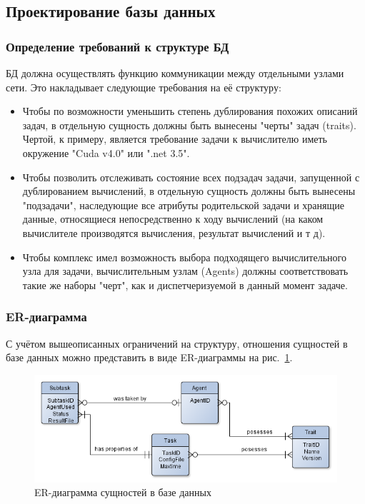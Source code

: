 \documentclass[a4paper,12pt]{report}
\numberwithin{equation}{section}
\begin{document}
\subsection{Проектирование базы данных}
\subsubsection{Определение требований к структуре БД}
БД должна осуществлять функцию коммуникации между отдельными узлами сети.
Это накладывает следующие требования на её структуру:
\begin{itemize}
  \item Чтобы по возможности уменьшить степень дублирования похожих описаний задач, в отдельную сущность должны быть вынесены "черты" задач (traits). Чертой, к примеру, является требование задачи к вычислителю иметь окружение "Cuda v4.0" или ".net 3.5".
  \item Чтобы позволить отслеживать состояние всех подзадач задачи, запущенной с дублированием вычислений, в отдельную сущность должны быть вынесены "подзадачи", наследующие все атрибуты родительской задачи и хранящие данные, относящиеся непосредственно к ходу вычислений (на каком вычислителе производятся вычисления, результат вычислений и т д).
  \item Чтобы комплекс имел возможность выбора подходящего вычислительного узла для задачи, вычислительным узлам (Agents) должны соответствовать такие же наборы "черт", как и диспетчеризуемой в данный момент задаче.
\end{itemize}

\subsubsection{ER-диаграмма}
С учётом вышеописанных ограничений на структуру, отношения сущностей в базе данных можно представить в виде ER-диаграммы на рис.~\ref{fig:db-erd}.

\begin{figure}
    \centering
    \includegraphics[width=\linewidth]{img/db-er-crowsfoot}
    \caption{ER-диаграмма сущностей в базе данных}
    \label{fig:db-erd}
\end{figure}
\end{document}
